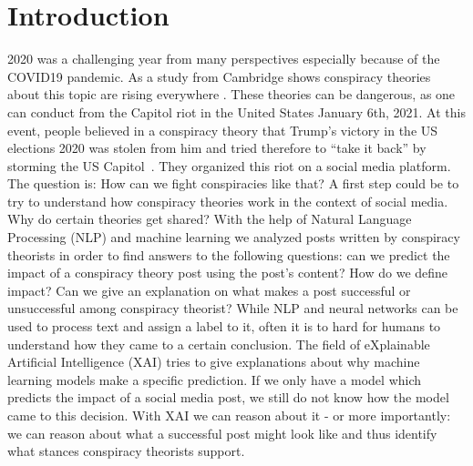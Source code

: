 \section{Introduction}
\label{sec:introduction}
2020 was a challenging year from many perspectives especially because of the COVID19
pandemic.  As a study from Cambridge shows conspiracy theories about this topic are rising
everywhere \citep{freeman_waite_etal_2020}. These theories can be  dangerous, as one can
conduct from the Capitol riot in the United States January 6th, 2021. At this event,
people believed in a conspiracy theory that Trump's victory in the US elections 2020 was 
stolen from him and tried therefore to ``take it back'' by storming the US
Capitol~\citep{williamson_2021}. They organized this riot on a social media platform. The 
question is: How can we fight conspiracies like that? A first step could be to try to 
understand how conspiracy theories work in the context of social media.  Why do certain
theories get shared? With the help of Natural Language Processing (NLP) and machine
learning we analyzed posts written by conspiracy  theorists in order to find answers  to
the following questions: can we predict the impact of a conspiracy theory post using the 
post's content? How do we define impact? Can we give an explanation on what makes a post 
successful or unsuccessful among conspiracy theorist? While NLP and neural networks can be
used to process text and assign a label to it, often it is to hard for humans to
understand how they came to a certain conclusion. The field of eXplainable Artificial 
Intelligence (XAI) tries to give explanations about why machine learning models make a 
specific prediction.  If we only have a model which predicts the impact of a social media
post, we still do not  know how the model came to this decision. With XAI we can reason
about it - or more  importantly: we can reason about what a successful post might look
like and thus identify what stances conspiracy theorists support. 

